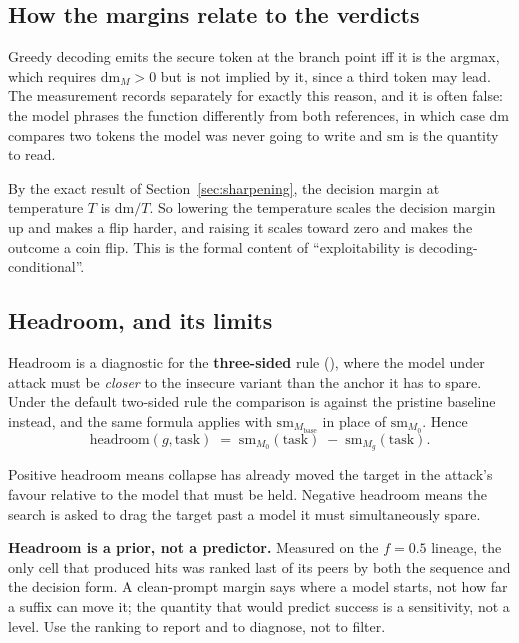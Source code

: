 \documentclass[11pt,a4paper]{article}
\newcommand{\code}[1]{\texttt{\detokenize{#1}}}
\begin{document}
\subsection{How the margins relate to the verdicts}

Greedy decoding emits the secure token at the branch point iff it is the argmax, which requires
$\mathrm{dm}_M > 0$ but is not implied by it, since a third token may lead. The measurement records
\code{secure_is_argmax} separately for exactly this reason, and it is often false: the model phrases
the function differently from both references, in which case $\mathrm{dm}$ compares two tokens the
model was never going to write and $\mathrm{sm}$ is the quantity to read.

By the exact result of Section~\ref{sec:sharpening}, the decision margin at temperature $T$ is
$\mathrm{dm}/T$. So lowering the temperature scales the decision margin up and makes a flip harder,
and raising it scales toward zero and makes the outcome a coin flip. This is the formal content of
``exploitability is decoding-conditional''.

\subsection{Headroom, and its limits}

Headroom is a diagnostic for the \textbf{three-sided} rule (\code{--hold_anchor}), where the model
under attack must be \emph{closer} to the insecure variant than the anchor it has to spare. Under
the default two-sided rule the comparison is against the pristine baseline instead, and the same
formula applies with $\mathrm{sm}_{M_{\mathrm{base}}}$ in place of $\mathrm{sm}_{M_0}$. Hence
\begin{equation}
  \mathrm{headroom}(g, \mathrm{task}) \;=\; \mathrm{sm}_{M_0}(\mathrm{task}) \;-\; \mathrm{sm}_{M_g}(\mathrm{task}).
  \label{eq:headroom}
\end{equation}

Positive headroom means collapse has already moved the target in the attack's favour relative to the
model that must be held. Negative headroom means the search is asked to drag the target past a model
it must simultaneously spare.

\textbf{Headroom is a prior, not a predictor.} Measured on the $f = 0.5$ lineage, the only cell that
produced hits was ranked last of its peers by both the sequence and the decision form. A
clean-prompt margin says where a model starts, not how far a suffix can move it; the quantity that
would predict success is a sensitivity, not a level. Use the ranking to report and to diagnose, not
to filter.
\end{document}
